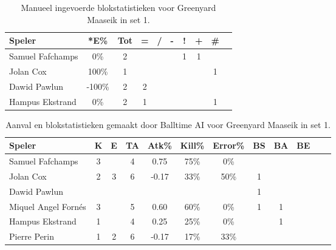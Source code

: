 \begin{table}[ht!]
    \centering
    \scriptsize
    \begin{tabular}{|l|c|c|c|c|c|c|c|c|c|} \hline
        \textbf{Speler} & *E\% & Tot & = & / & - & ! & + & \# \\ \hline
        Samuel Fafchamps & 0\% & 2 &  &  &  & 1 & 1 &  \\ 
        Jolan Cox & 100\% & 1 &  &  &  &  &  & 1 \\ 
        Dawid Pawlun & -100\% & 2 & 2 &  &  &  &  &  \\ 
        Hampus Ekstrand & 0\% & 2 & 1 &  &  &  &  & 1 \\ \hline
    \end{tabular}
    \caption[Manueel ingevoerde blokstatistieken voor Greenyard Maaseik in set 1]{\label{tab:PL1BlockMaaseikMan1}Manueel ingevoerde blokstatistieken voor Greenyard Maaseik in set 1.}
\end{table}

\begin{table}[ht!]
  \centering
  \scriptsize
  \begin{tabular}{|l|c|c|c|c|c|c|c|c|c|c|c|} \hline
    \textbf{Speler} & K & E & TA & Atk\% & Kill\% & Error\% & BS & BA & BE \\ \hline
    Samuel Fafchamps & 3 &  & 4 & 0.75 & 75\%& 0\% &  &  & \\
    Jolan Cox & 2 & 3 & 6 & -0.17 & 33\% & 50\% & 1 &  &  \\
    Dawid Pawlun &   &   &   &   &   &   &  1 &  &   \\
    Miquel Angel Fornés & 3 &  & 5 & 0.60 & 60\% & 0\% & 1 & 1 & \\
    Hampus Ekstrand & 1 &  & 4 & 0.25 & 25\% & 0\% &  & 1 & \\
    Pierre Perin & 1 & 2 & 6 & -0.17 & 17\% & 33\% &  &   &  \\ \hline
    \end{tabular}
  \caption[Aanvals- en blokstatistieken gemaakt door Balltime AI voor Greenyard Maaseik in set 1]{\label{tab:PL1AttBlockMaaseik1}Aanval en blokstatistieken gemaakt door Balltime AI voor Greenyard Maaseik in set 1.}
\end{table}

